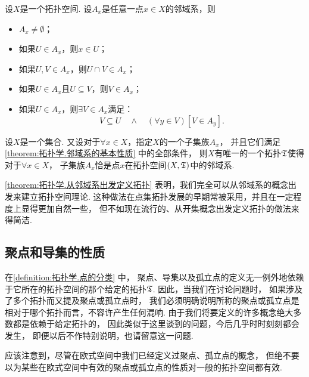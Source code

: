 \begin{theorem}\label{theorem:拓扑学.邻域系的基本性质}
设\(X\)是一个拓扑空间.
设\(A_x\)是任意一点\(x \in X\)的邻域系，则
\begin{itemize}
	\item \(A_x \neq \emptyset\)；
	\item 如果\(U \in A_x\)，则\(x \in U\)；
	\item 如果\(U,V \in A_x\)，则\(U \cap V \in A_x\)；
	\item 如果\(U \in A_x\)且\(U \subseteq V\)，则\(V \in A_x\)；
	\item 如果\(U \in A_x\)，则\(\exists V \in A_x\)满足：\[
		V \subseteq U
		\quad\land\quad
		(\forall y \in V)
		[V \in A_y].
	\]
\end{itemize}
\end{theorem}

\begin{theorem}\label{theorem:拓扑学.从邻域系出发定义拓扑}
设\(X\)是一个集合.
又设对于\(\forall x \in X\)，指定\(X\)的一个子集族\(A_x\)，
并且它们满足\cref{theorem:拓扑学.邻域系的基本性质} 中的全部条件，
则\(X\)有唯一的一个拓扑\(\mathfrak T\)使得对于\(\forall x \in X\)，
子集族\(A_x\)恰是点\(x\)在拓扑空间\((X,\mathfrak T)\)中的邻域系.
\end{theorem}

\cref{theorem:拓扑学.从邻域系出发定义拓扑}
表明，我们完全可以从邻域系的概念出发来建立拓扑空间理论.
这种做法在点集拓扑发展的早期常被采用，并且在一定程度上显得更加自然一些，
但不如现在流行的、从开集概念出发定义拓扑的做法来得简洁.

\subsection{聚点和导集的性质}
在\cref{definition:拓扑学.点的分类} 中，
聚点、导集以及孤立点的定义无一例外地依赖于它所在的拓扑空间的那个给定的拓扑\(\mathfrak T\).
因此，当我们在讨论问题时，
如果涉及了多个拓扑而又提及聚点或孤立点时，
我们必须明确说明所称的聚点或孤立点是相对于哪个拓扑而言，不容许产生任何混响.
由于我们将要定义的许多概念绝大多数都是依赖于给定拓扑的，
因此类似于这里谈到的问题，今后几乎时时刻刻都会发生，
即便以后不作特别说明，也请留意这一问题.

应该注意到，尽管在欧式空间中我们已经定义过聚点、孤立点的概念，
但绝不要以为某些在欧式空间中有效的聚点或孤立点的性质对一般的拓扑空间都有效.


